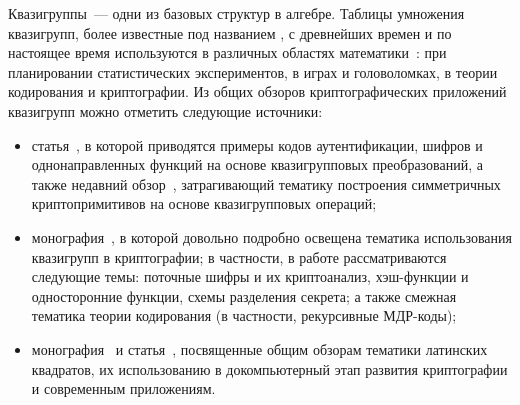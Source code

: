 {\actuality} 

    Квазигруппы~--- одни из базовых структур в алгебре.
    Таблицы умножения квазигрупп, более известные под названием , с древнейших времен и по настоящее время используются в различных областях математики~\autocite{keedwell}: при планировании статистических экспериментов, в играх и головоломках, в теории кодирования и криптографии.
    Из общих обзоров криптографических приложений квазигрупп можно отметить следующие источники:
    \begin{itemize}
        \item статья~\autocite{glukhov}, в которой приводятся примеры кодов аутентификации, шифров и однонаправленных функций на основе квазигрупповых преобразований, а также недавний обзор~\autocite{chauhan2021quasigroups}, затрагивающий тематику построения симметричных криптопримитивов на основе квазигрупповых операций;
        \item монография~\autocite{shcherbacov2017elements}, в которой довольно подробно освещена тематика использования квазигрупп в криптографии; в частности, в работе рассматриваются следующие темы: поточные шифры и их криптоанализ, хэш-функции и односторонние функции, схемы разделения секрета; а также смежная тематика теории кодирования (в частности, рекурсивные МДР-коды);
        \item монография~\autocite{keedwell} и статья~\autocite{tuzhilin2012}, посвященные общим обзорам тематики латинских квадратов, их использованию в докомпьютерный этап развития криптографии и современным приложениям.
    \end{itemize}

